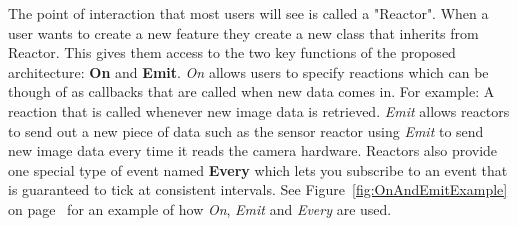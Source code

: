 \documentclass[english,12pt]{scrartcl}
\begin{document}
            The point of interaction that most users will see is called a "Reactor". When a user
            wants to create a new feature they create a new class that inherits from Reactor. This
            gives them access to the two key functions of the proposed architecture: \textbf{On} and
            \textbf{Emit}. \emph{On} allows users to specify reactions which can be though of as
            callbacks that are called when new data comes in. For example: A reaction that is called
            whenever new image data is retrieved. \emph{Emit} allows reactors to send out a new
            piece of data such as the sensor reactor using \emph{Emit} to send new image data every
            time it reads the camera hardware. Reactors also provide one special type of event named
            \textbf{Every} which lets you subscribe to an event that is guaranteed to tick at
            consistent intervals. See Figure~\ref{fig:OnAndEmitExample} on
            page~\pageref{fig:OnAndEmitExample} for an example of how \emph{On}, \emph{Emit} and
            \emph{Every} are used.
            
\end{document}
